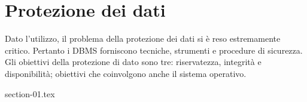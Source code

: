 \chapter{Protezione dei dati}%
\label{cha:Protezione dei dati}
Dato l'utilizzo, il problema della protezione dei dati si è reso estremamente
critico.
Pertanto i DBMS forniscono tecniche, strumenti e procedure di sicurezza.
Gli obiettivi della protezione di dato sono tre: riservatezza, integrità e
disponibilità; obiettivi che coinvolgono anche il sistema operativo.

{section-01.tex}

